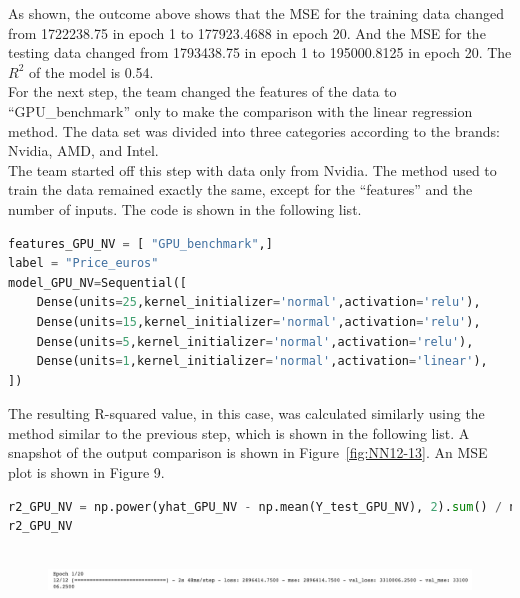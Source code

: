 \documentclass{scrartcl}
\begin{document}
\noindent As shown, the outcome above shows that the MSE for the training data changed from 1722238.75 in epoch 1 to 177923.4688 in epoch 20. And the MSE for the testing data changed from 1793438.75 in epoch 1 to 195000.8125 in epoch 20. The $R^2$ of the model is 0.54.\\







\noindent For the next step, the team changed the features of the data to “GPU\_benchmark” only to make the comparison with the linear regression method. The data set was divided into three categories according to the brands: Nvidia, AMD, and Intel. \\

\noindent The team started off this step with data only from Nvidia. The method used to train the data remained exactly the same, except for the “features” and the number of inputs. The code is shown in the following list. \\

\begin{lstlisting}[language=Python, caption= Code for training Nvidia data, basicstyle=\tiny,captionpos=b]
features_GPU_NV = [ "GPU_benchmark",]
label = "Price_euros"
model_GPU_NV=Sequential([
    Dense(units=25,kernel_initializer='normal',activation='relu'),
    Dense(units=15,kernel_initializer='normal',activation='relu'),
    Dense(units=5,kernel_initializer='normal',activation='relu'),
    Dense(units=1,kernel_initializer='normal',activation='linear'),
])

\end{lstlisting}


\noindent The resulting R-squared value, in this case, was calculated similarly using the method similar to the previous step, which is shown in the following list. A snapshot of the output comparison is shown in Figure~\ref{fig:NN12-13}. An MSE plot is shown in Figure 9. \\

\begin{lstlisting}[language=Python, caption= Code output for MSE Nvidia training, basicstyle=\tiny,captionpos=b]
r2_GPU_NV = np.power(yhat_GPU_NV - np.mean(Y_test_GPU_NV), 2).sum() / np.power(Y_test_GPU_NV - np.mean(Y_test_GPU_NV), 2).sum()
r2_GPU_NV
    
\end{lstlisting}


\begin{figure}[H]
         \centering
         \includegraphics[width=\textwidth]{Graphics/Neural Network Images/NN12.png}
\end{figure}
     
\end{document}
